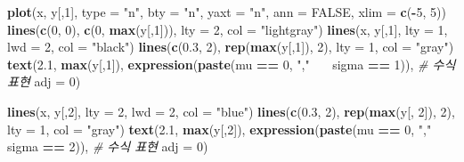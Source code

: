 \documentclass[
  11pt,
]{krantz}
\newenvironment{Shaded}{\begin{snugshade}}{\end{snugshade}}
\newcommand{\CommentTok}[1]{\textcolor[rgb]{0.37,0.37,0.37}{\textit{#1}}}
\newcommand{\DataTypeTok}[1]{\textcolor[rgb]{0.27,0.27,0.27}{#1}}
\newcommand{\DecValTok}[1]{\textcolor[rgb]{0.06,0.06,0.06}{#1}}
\newcommand{\ErrorTok}[1]{\textcolor[rgb]{0.14,0.14,0.14}{\textbf{#1}}}
\newcommand{\FloatTok}[1]{\textcolor[rgb]{0.06,0.06,0.06}{#1}}
\newcommand{\KeywordTok}[1]{\textcolor[rgb]{0.27,0.27,0.27}{\textbf{#1}}}
\newcommand{\NormalTok}[1]{#1}
\newcommand{\OperatorTok}[1]{\textcolor[rgb]{0.43,0.43,0.43}{\textbf{#1}}}
\newcommand{\OtherTok}[1]{\textcolor[rgb]{0.37,0.37,0.37}{#1}}
\newcommand{\StringTok}[1]{\textcolor[rgb]{0.5,0.5,0.5}{#1}}
\begin{document}
\begin{Shaded}
\begin{Highlighting}[]
\KeywordTok{plot}\NormalTok{(x, y[,}\DecValTok{1}\NormalTok{],}
     \DataTypeTok{type =} \StringTok{"n"}\NormalTok{,}
     \DataTypeTok{bty =} \StringTok{"n"}\NormalTok{,}
     \DataTypeTok{yaxt =} \StringTok{"n"}\NormalTok{,}
     \DataTypeTok{ann =} \OtherTok{FALSE}\NormalTok{,}
     \DataTypeTok{xlim =} \KeywordTok{c}\NormalTok{(}\OperatorTok{-}\DecValTok{5}\NormalTok{, }\DecValTok{5}\NormalTok{))}
\KeywordTok{lines}\NormalTok{(}\KeywordTok{c}\NormalTok{(}\DecValTok{0}\NormalTok{, }\DecValTok{0}\NormalTok{), }\KeywordTok{c}\NormalTok{(}\DecValTok{0}\NormalTok{, }\KeywordTok{max}\NormalTok{(y[,}\DecValTok{1}\NormalTok{])), }\DataTypeTok{lty =} \DecValTok{2}\NormalTok{, }\DataTypeTok{col =} \StringTok{"lightgray"}\NormalTok{)}
\KeywordTok{lines}\NormalTok{(x, y[,}\DecValTok{1}\NormalTok{], }\DataTypeTok{lty =} \DecValTok{1}\NormalTok{, }\DataTypeTok{lwd =} \DecValTok{2}\NormalTok{,}
      \DataTypeTok{col =} \StringTok{"black"}\NormalTok{)}
\KeywordTok{lines}\NormalTok{(}\KeywordTok{c}\NormalTok{(}\FloatTok{0.3}\NormalTok{, }\DecValTok{2}\NormalTok{), }\KeywordTok{rep}\NormalTok{(}\KeywordTok{max}\NormalTok{(y[,}\DecValTok{1}\NormalTok{]), }\DecValTok{2}\NormalTok{), }\DataTypeTok{lty =} \DecValTok{1}\NormalTok{, }\DataTypeTok{col =} \StringTok{"gray"}\NormalTok{)}
\KeywordTok{text}\NormalTok{(}\FloatTok{2.1}\NormalTok{, }\KeywordTok{max}\NormalTok{(y[,}\DecValTok{1}\NormalTok{]),}
     \KeywordTok{expression}\NormalTok{(}\KeywordTok{paste}\NormalTok{(mu }\OperatorTok{==}\StringTok{ }\DecValTok{0}\NormalTok{, }\StringTok{","} \OperatorTok{~}\ErrorTok{~}\StringTok{ }\NormalTok{sigma }\OperatorTok{==}\StringTok{ }\DecValTok{1}\NormalTok{)), }\CommentTok{# 수식 표현}
     \DataTypeTok{adj =} \DecValTok{0}\NormalTok{)}

\KeywordTok{lines}\NormalTok{(x, y[,}\DecValTok{2}\NormalTok{], }\DataTypeTok{lty =} \DecValTok{2}\NormalTok{, }\DataTypeTok{lwd =} \DecValTok{2}\NormalTok{, }\DataTypeTok{col =} \StringTok{"blue"}\NormalTok{)}
\KeywordTok{lines}\NormalTok{(}\KeywordTok{c}\NormalTok{(}\FloatTok{0.3}\NormalTok{, }\DecValTok{2}\NormalTok{), }\KeywordTok{rep}\NormalTok{(}\KeywordTok{max}\NormalTok{(y[, }\DecValTok{2}\NormalTok{]), }\DecValTok{2}\NormalTok{), }\DataTypeTok{lty =} \DecValTok{1}\NormalTok{, }\DataTypeTok{col =} \StringTok{"gray"}\NormalTok{)}
\KeywordTok{text}\NormalTok{(}\FloatTok{2.1}\NormalTok{, }\KeywordTok{max}\NormalTok{(y[,}\DecValTok{2}\NormalTok{]),}
     \KeywordTok{expression}\NormalTok{(}\KeywordTok{paste}\NormalTok{(mu }\OperatorTok{==}\StringTok{ }\DecValTok{0}\NormalTok{, }\StringTok{","} \OperatorTok{~}\ErrorTok{~}\StringTok{ }\NormalTok{sigma }\OperatorTok{==}\StringTok{ }\DecValTok{2}\NormalTok{)), }\CommentTok{# 수식 표현}
     \DataTypeTok{adj =} \DecValTok{0}\NormalTok{)}


\end{Highlighting}
\end{Shaded}
\end{document}

